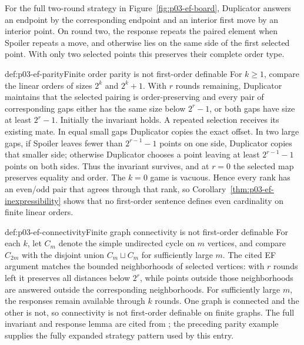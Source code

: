 For the full two-round strategy in Figure~\ref{fig:p03-ef-board}, Duplicator
answers an endpoint by the corresponding endpoint and an interior first move
by an interior point.  On round two, the response repeats the paired element
when Spoiler repeats a move, and otherwise lies on the same side of the first
selected point.  With only two selected points this preserves their complete
order type.

\begin{hbexample}{def:p03-ef-parity}{Finite order parity is not first-order definable}
For \(k\geq1\), compare the linear orders of sizes \(2^k\) and \(2^k+1\).
With \(r\) rounds remaining, Duplicator maintains that the selected pairing is
order-preserving and every pair of corresponding gaps either has the same size
below \(2^r-1\), or both gaps have size at least \(2^r-1\).  Initially the
invariant holds.  A repeated selection receives its existing mate.  In equal
small gaps Duplicator copies the exact offset.
In two large gaps, if Spoiler leaves fewer than \(2^{r-1}-1\) points on one
side, Duplicator copies that smaller side; otherwise Duplicator chooses a point
leaving at least \(2^{r-1}-1\) points on both sides.  Thus the invariant
survives, and at \(r=0\) the selected map preserves equality and order.  The
\(k=0\) game is vacuous.  Hence every rank has an even/odd pair that agrees
through that rank, so Corollary~\ref{thm:p03-ef-inexpressibility} shows that no
first-order sentence defines even cardinality on finite linear orders.
\end{hbexample}

\begin{hbexample}{def:p03-ef-connectivity}{Finite graph connectivity is not first-order definable}
For each \(k\), let \(C_m\) denote the simple undirected cycle on \(m\)
vertices, and compare \(C_{2m}\) with the disjoint union \(C_m\sqcup C_m\)
for sufficiently large \(m\).  The cited EF argument matches the bounded
neighborhoods of selected vertices: with \(r\) rounds left it preserves all
distances below \(2^r\), while points outside those neighborhoods are answered
outside the corresponding neighborhoods.  For sufficiently large \(m\), the
responses remain available through \(k\) rounds.  One graph is connected and
the other is not, so connectivity is not first-order definable on finite
graphs.  The full invariant and response lemma are cited from
\cite{Libkin2004}; the preceding parity example supplies the fully expanded
strategy pattern used by this entry.
\end{hbexample}
